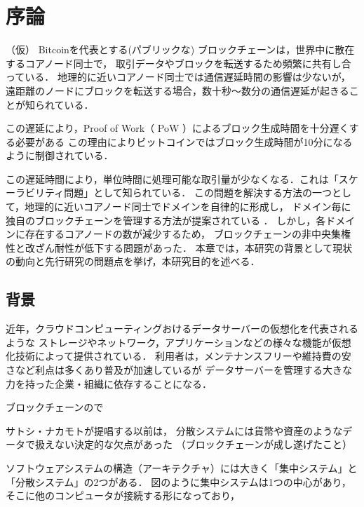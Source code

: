 \documentclass[a4paper,12pt]{jsarticle}
\begin{document}

\section{序論}

（仮）
Bitcoinを代表とする(パブリックな) ブロックチェーンは，世界中に散在するコアノード同士で，
取引データやブロックを転送するため頻繁に共有し合っている．
地理的に近いコアノード同士では通信遅延時間の影響は少ないが，
遠距離のノードにブロックを転送する場合，数十秒〜数分の通信遅延が起きることが知られている．

この遅延により，Proof of Work（ PoW ）によるブロック生成時間を十分遅くする必要がある
この理由によりビットコインではブロック生成時間が10分になるように制御されている．

この遅延時間により，単位時間に処理可能な取引量が少なくなる．これは「スケーラビリティ問題」として知られている． 
この問題を解決する方法の一つとして，地理的に近いコアノード同士でドメインを自律的に形成し，
ドメイン毎に独自のブロックチェーンを管理する方法が提案されている \cite{fujihara1}\cite{fujihara2}．
しかし，各ドメインに存在するコアノードの数が減少するため，
ブロックチェーンの非中央集権性と改ざん耐性が低下する問題があった．
本章では，本研究の背景として現状の動向と先行研究の問題点を挙げ，本研究目的を述べる．


\subsection{背景}
近年，クラウドコンピューティングおけるデータサーバーの仮想化を代表されるような
ストレージやネットワーク，アプリケーションなどの様々な機能が仮想化技術によって提供されている．
利用者は，メンテナンスフリーや維持費の安さなど利点は多くあり普及が加速しているが
データサーバーを管理する大きな力を持った企業・組織に依存することになる．

ブロックチェーンので

サトシ・ナカモトが提唱する以前は，
分散システムには貨幣や資産のようなデータで扱えない決定的な欠点があった
（ブロックチェーンが成し遂げたこと）



ソフトウェアシステムの構造（アーキテクチャ）には大きく「集中システム」と「分散システム」の2つがある．
図のように集中システムは1つの中心があり，そこに他のコンピュータが接続する形になっており，
\end{document}
